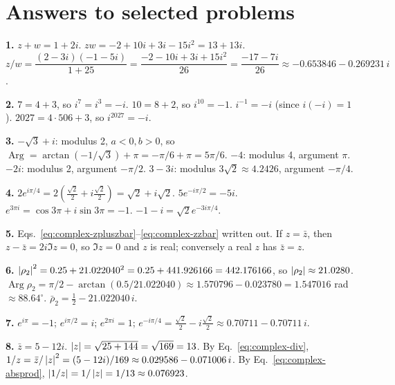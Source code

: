 \begin{problemlist}

\end{problemlist}

\section{Answers to selected problems}

\textbf{1.} $z+w=1+2i$. $zw=-2+10i+3i-15i^2=13+13i$. $z/w=\dfrac{(2-3i)(-1-5i)}{1+25}=\dfrac{-2-10i+3i+15i^2}{26}=\dfrac{-17-7i}{26}\approx-0.653846-0.269231\,i$.

\textbf{2.} $7=4+3$, so $i^7=i^3=-i$. $10=8+2$, so $i^{10}=-1$. $i^{-1}=-i$ (since $i(-i)=1$). $2027=4\cdot506+3$, so $i^{2027}=-i$.

\textbf{3.} $-\sqrt3+i$: modulus 2, $a<0,b>0$, so $\operatorname{Arg}=\arctan(-1/\sqrt3)+\pi=-\pi/6+\pi=5\pi/6$. $-4$: modulus 4, argument $\pi$. $-2i$: modulus 2, argument $-\pi/2$. $3-3i$: modulus $3\sqrt2\approx4.2426$, argument $-\pi/4$.

\textbf{4.} $2e^{i\pi/4}=2(\tfrac{\sqrt2}2+i\tfrac{\sqrt2}2)=\sqrt2+i\sqrt2$. $5e^{-i\pi/2}=-5i$. $e^{3\pi i}=\cos3\pi+i\sin3\pi=-1$. $-1-i=\sqrt2e^{-3i\pi/4}$.

\textbf{5.} Eqs.~\eqref{eq:complex-zpluszbar}--\eqref{eq:complex-zzbar} written out. If $z=\bar z$, then $z-\bar z=2i\Im z=0$, so $\Im z=0$ and $z$ is real; conversely a real $z$ has $\bar z=z$.

\textbf{6.} $\left\lvert \rho_2\right\rvert^2=0.25+21.022040^2=0.25+441.926166=442.176166$, so $\left\lvert \rho_2\right\rvert\approx21.0280$. $\operatorname{Arg}\rho_2=\pi/2-\arctan(0.5/21.022040)\approx1.570796-0.023780=1.547016$ rad $\approx88.64^\circ$. $\bar\rho_2=\tfrac12-21.022040\,i$.

\textbf{7.} $e^{i\pi}=-1$; $e^{i\pi/2}=i$; $e^{2\pi i}=1$; $e^{-i\pi/4}=\tfrac{\sqrt2}2-i\tfrac{\sqrt2}2\approx0.70711-0.70711\,i$.

\textbf{8.} $\bar z=5-12i$. $\left\lvert z\right\rvert=\sqrt{25+144}=\sqrt{169}=13$. By Eq.~\eqref{eq:complex-div}, $1/z=\bar z/\left\lvert z\right\rvert^2=(5-12i)/169\approx0.029586-0.071006\,i$. By Eq.~\eqref{eq:complex-absprod}, $\left\lvert 1/z\right\rvert=1/\left\lvert z\right\rvert=1/13\approx0.076923$.

